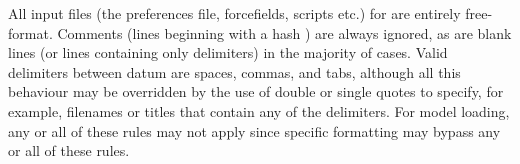 All input files (the preferences file, forcefields, scripts etc.) for \progname{} are entirely free-format. Comments (lines beginning with a hash \qte{\#}) are always ignored, as are blank lines (or lines containing only delimiters) in the majority of cases. Valid delimiters between datum are spaces, commas, and tabs, although all this behaviour may be overridden by the use of double or single quotes to specify, for example, filenames or titles that contain any of the delimiters. For model loading, any or all of these rules may not apply since specific formatting may bypass any or all of these rules.\\




